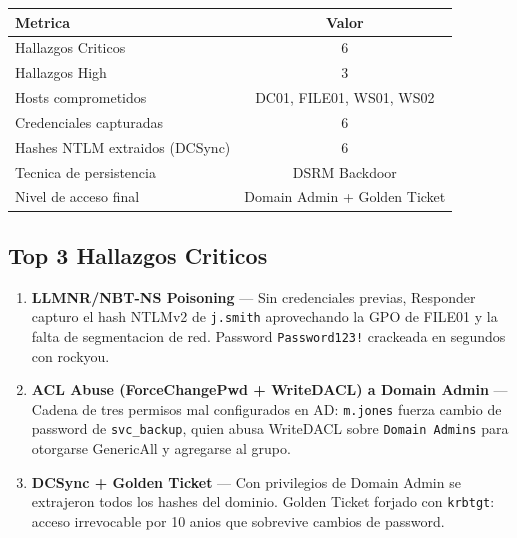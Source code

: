\documentclass[11pt,a4paper]{article}
\begin{document}
\begin{center}
\begin{tabular}{lc}
\toprule
\textbf{Metrica} & \textbf{Valor} \\
\midrule
Hallazgos Criticos               & 6 \\
Hallazgos High                   & 3 \\
Hosts comprometidos              & DC01, FILE01, WS01, WS02 \\
Credenciales capturadas          & 6 \\
Hashes NTLM extraidos (DCSync)   & 6 \\
Tecnica de persistencia          & DSRM Backdoor \\
Nivel de acceso final            & Domain Admin + Golden Ticket \\
\bottomrule
\end{tabular}
\end{center}

\vspace{0.4cm}

\subsection*{Top 3 Hallazgos Criticos}

\begin{enumerate}[leftmargin=*, label=\textbf{\arabic*.}]
  \item \textbf{LLMNR/NBT-NS Poisoning} ---
    Sin credenciales previas, Responder capturo el hash NTLMv2 de \texttt{j.smith}
    aprovechando la GPO de FILE01 y la falta de segmentacion de red.
    Password \texttt{Password123!} crackeada en segundos con rockyou.

  \item \textbf{ACL Abuse (ForceChangePwd + WriteDACL) a Domain Admin} ---
    Cadena de tres permisos mal configurados en AD: \texttt{m.jones} fuerza
    cambio de password de \texttt{svc\_backup}, quien abusa WriteDACL sobre
    \texttt{Domain Admins} para otorgarse GenericAll y agregarse al grupo.

  \item \textbf{DCSync + Golden Ticket} ---
    Con privilegios de Domain Admin se extrajeron todos los hashes del dominio.
    Golden Ticket forjado con \texttt{krbtgt}: acceso irrevocable por 10 anios
    que sobrevive cambios de password.
\end{enumerate}

\newpage

\end{document}
